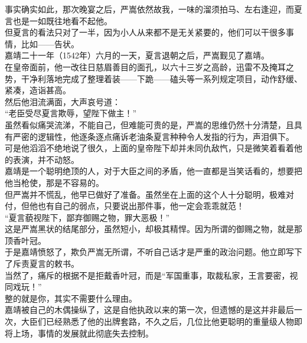 \begin{multicols}{\theparacolNo}
事实确实如此，那次晚宴之后，严嵩依然故我，一味的溜须拍马、左右逢迎，而夏言也是一如既往地看不起他。\\

但夏言的看法只对了一半，因为小人从来都不是无关紧要的，他们可以干很多事情，比如——告状。\\

嘉靖二十一年（1542年）六月的一天，夏言退朝之后，严嵩觐见了嘉靖。\\

在皇帝面前，他一改往日慈眉善目的面孔，以六十三岁之高龄，迅雷不及掩耳之势，干净利落地完成了整理着装——下跪——磕头等一系列规定项目，动作舒缓、紧凑，造诣甚高。\\

然后他泪流满面，大声哀号道：\\

“老臣受尽夏言欺辱，望陛下做主！”\\

虽然看似痛哭流涕，不能自己，但难能可贵的是，严嵩的思维仍然十分清楚，且具有严密的逻辑性，他逐条逐点痛诉老油条夏言种种令人发指的行为，声泪俱下。\\

可是他滔滔不绝地说了很久，上面的皇帝陛下却并未同仇敌忾，只是微笑着看着他的表演，并不动怒。\\

嘉靖是一个聪明绝顶的人，对于大臣之间的矛盾，他一直都是当笑话看的，想要把他当枪使，那是不容易的。\\

但严嵩并不慌乱，他早已做好了准备。虽然坐在上面的这个人十分聪明，极难对付，但他也有自己的弱点，只要说出那件事，他一定会乖乖就范！\\

“夏言藐视陛下，鄙弃御赐之物，罪大恶极！”\\

这是严嵩黑状的结尾部分，虽然短小，却极其精悍。因为所谓的御赐之物，就是那顶香叶冠。\\

于是嘉靖愤怒了，欺负严嵩无所谓，不听自己话才是严重的政治问题。他立即写下了斥责夏言的敕书。\\

当然了，痛斥的根据不是拒戴香叶冠，而是“军国重事，取裁私家，王言要密，视同戏玩！”\\

整的就是你，其实不需要什么理由。\\

嘉靖被自己的木偶操纵了，这是自他执政以来的第一次，但遗憾的是这并非最后一次，大臣们已经熟悉了他的出牌套路，不久之后，几位比他更聪明的重量级人物即将上场，事情的发展就此彻底失去控制。\\


\end{multicols}
